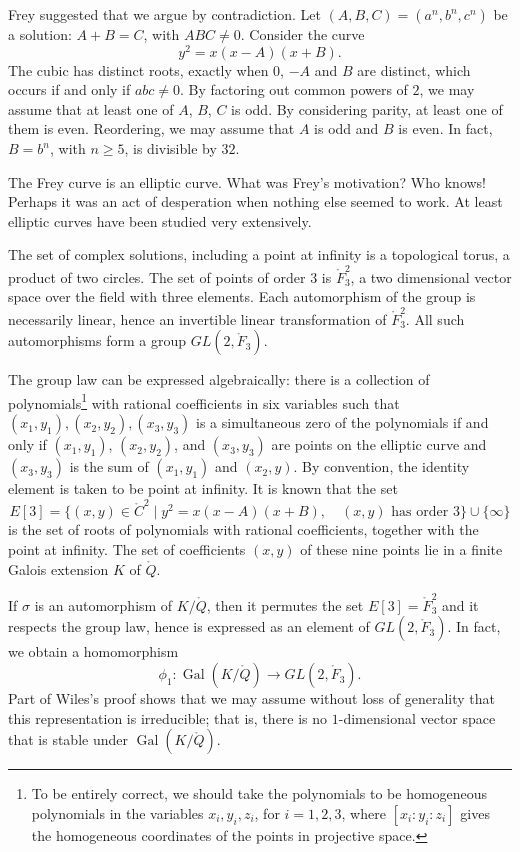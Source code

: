 \documentclass{amsart}
\def\op#1{{\operatorname{#1}}}
\def\CC{\ring{C}}
\def\oG{\op{Gal}}
\begin{document}
Frey suggested that we argue by contradiction.  Let
$(A,B,C)=(a^n,b^n,c^n)$ be a solution: $A+B=C$, with $ABC\ne
0$. Consider the curve
\[
y^2 = x (x - A) (x + B).
\]
The cubic has distinct roots, exactly when $0$, $-A$ and $B$ are
distinct, which occurs if and only if $abc\ne 0$.  By factoring out
common powers of $2$, we may assume that at least one of $A$, $B$, $C$
is odd.  By considering parity, at least one of them is even.
Reordering, we may assume that $A$ is odd and $B$ is even.  In fact,
$B=b^n$, with $n\ge 5$, is divisible by $32$.


The Frey curve is an elliptic curve.  What was Frey's motivation?  Who
knows! Perhaps it was an act of desperation when nothing else seemed
to work. At least elliptic curves have been studied very extensively.

The set of complex solutions, including a point at infinity is a
topological torus, a product of two circles.  The set of points of
order $3$ is $\ring{F}_3^2$, a two dimensional vector space over the
field with three elements.  Each automorphism of the group is
necessarily linear, hence an invertible linear transformation of
$\ring{F}^2_3$.  All such automorphisms form a group
$GL(2,\ring{F}_3)$.

The group law can be expressed algebraically: there is a collection of
polynomials\footnote{To be entirely correct, we should take the
  polynomials to be homogeneous polynomials in the variables
  $x_i,y_i,z_i$, for $i=1,2,3$, where $[x_i:y_i:z_i]$ gives the
  homogeneous coordinates of the points in projective space.}  with
rational coefficients in six variables such that
$(x_1,y_1),(x_2,y_2),(x_3,y_3)$ is a simultaneous zero of the
polynomials if and only if $(x_1,y_1)$, $(x_2,y_2)$, and $(x_3,y_3)$
are points on the elliptic curve and $(x_3,y_3)$ is the sum of
$(x_1,y_1)$ and $(x_2,y)$.  By convention, the identity element is
taken to be point at infinity.  It is known that the set
\[
E[3]= \{(x,y) \in \CC^2\mid y^2 = x (x-A) (x+B), 
\quad (x,y) \text{ has order } 3\}\cup \{\infty\}
\]
is the set of roots of polynomials with rational coefficients,
together with the point at infinity.  The set of coefficients $(x,y)$
of these nine points lie in a finite Galois extension $K$ of
$\ring{Q}$.

If $\sigma$ is an automorphism of $K/\ring{Q}$, then it permutes the
set $E[3]=\ring{F}_3^2$ and it respects the group law, hence is
expressed as an element of $GL(2,\ring{F}_3)$.  In fact, we obtain a
homomorphism
\[
\phi_1 : \oG(K/\ring{Q}) \to GL(2,\ring{F}_3).
\]
Part of Wiles's proof shows that we may assume without loss of
generality that this representation is irreducible; that is, there is
no $1$-dimensional vector space that is stable under
$\oG(K/\ring{Q})$.
\end{document}

